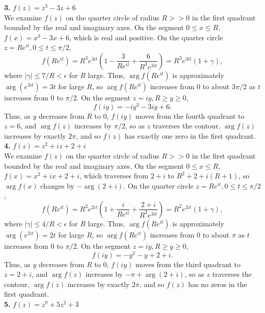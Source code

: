 \documentclass[12pt,letterpaper]{article}
\begin{document}
\textbf{3.} \(f(z) = z^{3} - 3z + 6\) \\

We examine \(f(z)\) on the quarter circle of radius \(R >> 0\) in the first quadrant bounded by the real and imaginary axes. On the segment \(0 \leq x \leq R\), \(f(x) = x^{3} - 3x + 6\), which is real and positive. On the quarter circle \(z = Re^{it}, 0 \leq t \leq \pi/2\), \[f(Re^{it}) = R^{3}e^{3it}\left(1 - \frac{3}{Re^{it}} + \frac{6}{R^{3}e^{3it}}\right) = R^{3}e^{3it}(1+\gamma),\] where \(|\gamma| \leq 7/R < \epsilon\) for \(R\) large. Thus, \(\arg f(Re^{it})\) is approximately \(\arg  (e^{3it}) = 3t\) for large \(R\), so \(\arg f(Re^{it})\) increases from \(0\) to about \(3\pi/2\) as \(t\) increases from \(0\) to \(\pi/2\). On the segment \(z=iy, R \geq y \geq 0\), \[f(iy) = -iy^{3} - 3iy + 6.\] Thus, as \(y\) decreases from \(R\) to \(0\), \(f(iy)\) moves from the fourth quadrant to \(z = 6\), and \(\arg f(z)\) increases by \(\pi/2\), so as \(z\) traverses the contour, \(\arg f(z)\) increases by exactly \(2\pi\), and so \(f(z)\) has exactly one zero in the first quadrant. \\

\textbf{4.} \(f(z) = z^{2} + iz + 2 + i\) \\

We examine \(f(z)\) on the quarter circle of radius \(R >> 0\) in the first quadrant bounded by the real and imaginary axes. On the segment \(0 \leq x \leq R\), \(f(x) = x^{2} + ix + 2 + i\), which traverses from \(2+i\) to \(R^{2} + 2 + i(R+1)\), so \(\arg f(x)\) changes by \(-\arg (2+i)\). On the quarter circle \(z = Re^{it}, 0 \leq t \leq \pi/2\), \[f(Re^{it}) = R^{2}e^{2it}\left(1 + \frac{i}{Re^{it}} + \frac{2+i}{R^{3}e^{3it}}\right) = R^{2}e^{2it}(1+\gamma),\] where \(|\gamma| \leq 4/R < \epsilon\) for \(R\) large. Thus, \(\arg f(Re^{it})\) is approximately \(\arg  (e^{2it}) = 2t\) for large \(R\), so \(\arg f(Re^{it})\) increases from \(0\) to about \(\pi\) as \(t\) increases from \(0\) to \(\pi/2\). On the segment \(z=iy, R \geq y \geq 0\), \[f(iy) = -y^{2} - y + 2 + i.\] Thus, as \(y\) decreases from \(R\) to \(0\), \(f(iy)\) moves from the third quadrant to \(z = 2+i\), and \(\arg f(z)\) increases by \(-\pi + \arg (2+i)\), so as \(z\) traverses the contour, \(\arg f(z)\) increases by exactly \(2\pi\), and so \(f(z)\) has no zeros in the first quadrant. \\

\textbf{5.} \(f(z) = z^{9} + 5z^{2} + 3\) \\
\end{document}
